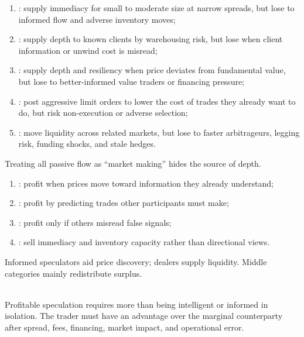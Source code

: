 \documentclass[a4paper,oneside,openany]{book}
\begin{document}
\begin{taxonomy} 
\begin{enumerate}[label=\roman*.]
\setlength{\itemsep}{0pt}
\item {}: supply immediacy for small to moderate size at narrow spreads, but lose to informed flow and adverse inventory moves;
\item {}: supply depth to known clients by warehousing risk, but lose when client information or unwind cost is misread;
\item {}: supply depth and resiliency when price deviates from fundamental value, but lose to better-informed value traders or financing pressure;
\item {}: post aggressive limit orders to lower the cost of trades they already want to do, but risk non-execution or adverse selection;
\item {}: move liquidity across related markets, but lose to faster arbitrageurs, legging risk, funding shocks, and stale hedges.
\end{enumerate}
Treating all passive flow as ``market making'' hides the source of depth.
\end{taxonomy}

\begin{taxonomy} 
\begin{enumerate}[label=\roman*.]
\setlength{\itemsep}{0pt}
\item {}: profit when prices move toward information they already understand;
\item {}: profit by predicting trades other participants must make;
\item {}: profit only if others misread false signals;
\item {}: sell immediacy and inventory capacity rather than directional views.
\end{enumerate}
Informed speculators aid price discovery; dealers supply liquidity. Middle categories mainly redistribute surplus.
\end{taxonomy}

\begin{principle} \\
Profitable speculation requires more than being intelligent or informed in isolation. The trader must have an advantage over the marginal counterparty after spread, fees, financing, market impact, and operational error.
\end{principle}
\end{document}
